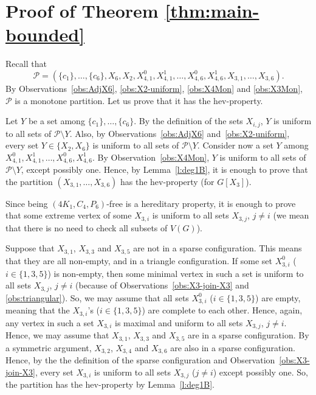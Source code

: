 \documentclass[12pt]{article}
\begin{document}

%
\section{Proof of Theorem \ref{thm:main-bounded}}\label{sec:main}


Recall that $$
\mathcal P = \left(\{c_1\}, \dots, \{c_6\}, X_6, X_2, X_{4, 1}^0, X_{4, 1}^1, \dots, X_{4, 6}^0, X_{4, 6}^1, X_{3, 1}, \dots, X_{3, 6}\right).
$$
By Observations~\ref{obs:AdjX6}, \ref{obs:X2-uniform}, \ref{obs:X4Mon} and \ref{obs:X3Mon}, $\mathcal P$ is a monotone partition. Let us prove that it has the hev-property. 

Let $Y$ be a set among $\{c_1\}, \dots, \{c_6\}$. 
By the definition of the sets $X_{i, j}$, $Y$ is uniform to all sets of $\mathcal P\setminus Y$.  
Also, by Observations~\ref{obs:AdjX6} and~\ref{obs:X2-uniform}, every set $Y\in \{X_2, X_6\}$ is uniform to all sets of $\mathcal P\setminus Y$.  
Consider now a set $Y$ among $X_{4, 1}^0, X_{4, 1}^1, \dots, X_{4, 6}^0, X_{4, 6}^1$. 
By Observation~\ref{obs:X4Mon}, $Y$ is uniform to all sets of $\mathcal P\setminus Y$, except possibly one.  
Hence, by Lemma~\ref{l:deg1B}, it is enough to prove that the partition  $(X_{3, 1}, \dots, X_{3, 6})$ has the hev-property (for $G[X_3]$). 

Since being $(4K_1, C_4, P_6)$-free is a hereditary property, it is enough to prove that some extreme vertex of some $X_{3, i}$ is uniform to all sets $X_{3, j}$, $j\neq i$ (we mean that there is no need to check all subsets  of $V(G)$).  



Suppose that $X_{3,1}$, $X_{3,3}$ and $X_{3,5}$ are not in a sparse configuration. This means that they are all non-empty, and in a triangle configuration. 
If some set $X_{3, i}^0$ ($i \in \{1, 3, 5\}$) is non-empty, then some minimal vertex in such a set is uniform to all sets   $X_{3, j}$, $j\neq i$  (because of Observations~\ref{obs:X3-join-X3} and \ref{obs:triangular}). 
So, we may assume that all sets $X_{3, i}^0$ ($i \in \{1, 3, 5\}$) are empty, meaning that the $X_{3, i}$'s ($i \in \{1, 3, 5\}$) are complete to each other. 
Hence, again, any vertex in such a set  $X_{3, i}$ is maximal and uniform to all sets $X_{3, j}$, $j\neq i$.
%
Hence, we may assume that $X_{3,1}$, $X_{3,3}$ and $X_{3,5}$ are in a sparse configuration.  
By a symmetric argument, $X_{3,2}$, $X_{3,4}$ and $X_{3,6}$ are also in a sparse configuration. 
Hence, by the the definition of the sparse configuration and Observation~\ref{obs:X3-join-X3}, every set $X_{3, i}$ is uniform to all sets $X_{3, j}$ ($j\neq i$) except possibly one. 
So, the partition has the hev-property by Lemma~\ref{l:deg1B}.
\end{document}
